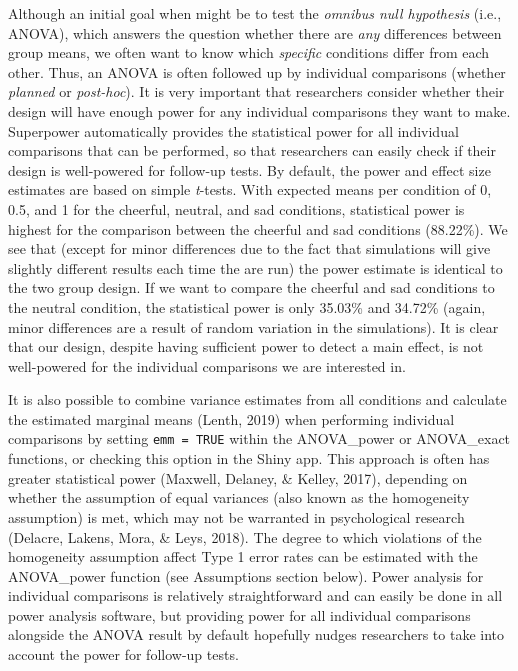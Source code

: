 \documentclass[
  ,jou,floatsintext]{apa6}
\begin{document}
Although an initial goal when might be to test the \emph{omnibus null hypothesis} (i.e., ANOVA), which answers the question whether there are \emph{any} differences between group means, we often want to know which \emph{specific} conditions differ from each other.
Thus, an ANOVA is often followed up by individual comparisons (whether \emph{planned} or \emph{post-hoc}).
It is very important that researchers consider whether their design will have enough power for any individual comparisons they want to make.
Superpower automatically provides the statistical power for all individual comparisons that can be performed, so that researchers can easily check if their design is well-powered for follow-up tests.
By default, the power and effect size estimates are based on simple \emph{t}-tests.
With expected means per condition of 0, 0.5, and 1 for the cheerful, neutral, and sad conditions, statistical power is highest for the comparison between the cheerful and sad conditions (88.22\%).
We see that (except for minor differences due to the fact that simulations will give slightly different results each time the are run) the power estimate is identical to the two group design.
If we want to compare the cheerful and sad conditions to the neutral condition, the statistical power is only 35.03\% and 34.72\% (again, minor differences are a result of random variation in the simulations).
It is clear that our design, despite having sufficient power to detect a main effect, is not well-powered for the individual comparisons we are interested in.

It is also possible to combine variance estimates from all conditions and calculate the estimated marginal means (Lenth, 2019) when performing individual comparisons by setting \texttt{emm\ =\ TRUE} within the ANOVA\_power or ANOVA\_exact functions, or checking this option in the Shiny app.
This approach is often has greater statistical power (Maxwell, Delaney, \& Kelley, 2017), depending on whether the assumption of equal variances (also known as the homogeneity assumption) is met, which may not be warranted in psychological research (Delacre, Lakens, Mora, \& Leys, 2018).
The degree to which violations of the homogeneity assumption affect Type 1 error rates can be estimated with the ANOVA\_power function (see Assumptions section below).
Power analysis for individual comparisons is relatively straightforward and can easily be done in all power analysis software, but providing power for all individual comparisons alongside the ANOVA result by default hopefully nudges researchers to take into account the power for follow-up tests.
\end{document}
